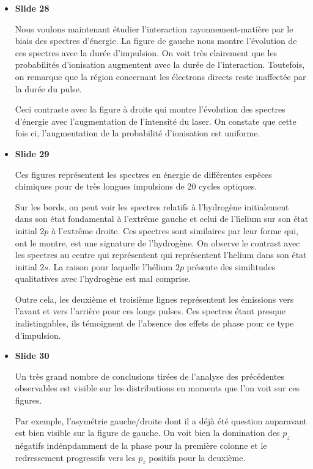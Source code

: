 \documentclass[10pt,a4paper]{article}
\begin{document}
\begin{itemize}
On peut voir sur la figure suivante l'\'evolution des
effets de phase avec l'augmentation de la dur\'ee de l'impulsion.
On voit clairement la disparition de l'asym\'etrie gauche/droite.


\item \textbf{Slide 28}\par
Nous voulons maintenant \'etudier l'interaction rayonnement-mati\`ere 
par le biais des spectres d'\'energie.
La figure de gauche nous montre l'\'evolution de ces spectres 
avec la dur\'ee d'impulsion. 
On voit tr\`es clairement que les probabilit\'es d'ionisation augmentent 
avec la dur\'ee de l'interaction.
Toutefois, on remarque que la r\'egion concernant les \'electrons directs
reste inaffect\'ee par la dur\'ee du pulse.

Ceci contraste avec la figure \`a droite qui montre 
l'\'evolution des spectres d'\'energie avec l'augmentation de l'intensit\'e 
du laser. 
On constate que cette fois ci, l'augmentation de la probabilit\'e 
d'ionisation est uniforme.


\item \textbf{Slide 29}\par
Ces figures repr\'esentent les spectres en \'energie de
diff\'erentes esp\`eces chimiques pour de tr\`es longues impulsions de 
20 cycles optiques.

Sur les bords, on peut voir les spectres 
relatifs \`a l'hydrog\`ene initialement dans son \'etat fondamental 
\`a l'extr\^eme gauche
et celui de l'\'helium sur son \'etat initial $2p$ \`a l'extr\^eme droite.
Ces spectres sont similaires par leur forme qui, 
ont le montre, est une signature de l'hydrog\`ene.
On observe le contrast avec les spectres au centre qui repr\'esentent 
qui repr\'esentent l'helium dans son \'etat initial $2s$.
La raison pour laquelle l'h\'elium $2p$ pr\'esente des similitudes 
qualitatives avec l'hydrog\`ene est mal comprise.

Outre cela, les deuxi\`eme et troisi\`eme lignes
repr\'esentent les \'emissions vers l'avant et vers l'arri\`ere pour 
ces longs pulses.
Ces spectres \'etant presque indistingables, 
ils t\'emoignent de l'absence des effets de phase pour ce type 
d'impulsion.


\item \textbf{Slide 30}\par
Un tr\`es grand nombre de conclusions tir\'ees de l'analyse 
des pr\'ec\'edentes observables est visible sur les distributions
en moments que l'on voit sur ces figures.

Par exemple, l'asym\'etrie gauche/droite dont il a d\'ej\`a \'et\'e 
question auparavant est bien visible sur la figure de gauche.
On voit bien la domination des $p_z$ n\'egatifs 
ind\'enpdamment de la phase pour la premi\`ere colonne 
et le redressement progressifs vers les $p_z$
positifs pour la deuxi\`eme.


\end{itemize}
\end{document}
